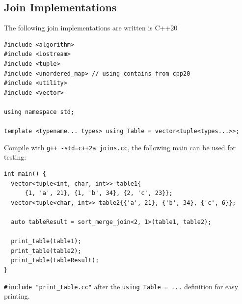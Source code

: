\subsection{Join Implementations}
The following join implementations are written is C++20
\begin{verbatim}
#include <algorithm>
#include <iostream>
#include <tuple>
#include <unordered_map> // using contains from cpp20
#include <utility>
#include <vector>

using namespace std;

template <typename... types> using Table = vector<tuple<types...>>;
\end{verbatim}
Compile with \texttt{g++ -std=c++2a joins.cc}, the following main can be used for testing:
\begin{verbatim}
int main() {
  vector<tuple<int, char, int>> table1{
      {1, 'a', 21}, {1, 'b', 34}, {2, 'c', 23}};
  vector<tuple<char, int>> table2{{'a', 21}, {'b', 34}, {'c', 6}};

  auto tableResult = sort_merge_join<2, 1>(table1, table2);

  print_table(table1);
  print_table(table2);
  print_table(tableResult);
}
\end{verbatim}
\texttt{#include "print_table.cc"} after the \texttt{using Table = ...} definition for easy printing.

